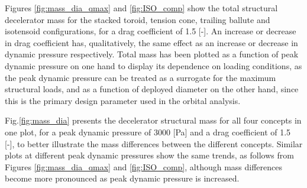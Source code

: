 
Figures \ref{fig:mass_dia_qmax} and \ref{fig:ISO_comp} show the total structural decelerator mass for the stacked toroid, tension cone, trailing ballute and isotensoid configurations, for a drag coefficient of 1.5 [-]. An increase or decrease in drag coefficient has, qualitatively, the same effect as an increase or decrease in dynamic pressure respectively. Total mass has been plotted as a function of peak dynamic pressure on one hand to display its dependence on loading conditions, as the peak dynamic pressure can be treated as a surrogate for the maximum structural loads, and as a function of deployed diameter on the other hand, since this is the primary design parameter used in the orbital analysis. 

Fig.\ref{fig:mass_dia} presents the decelerator structural mass for all four concepts in one plot, for a peak dynamic pressure of 3000 [Pa] and a drag coefficient of 1.5 [-], to better illustrate the mass differences between the different concepts. Similar plots at different peak dynamic pressures show the same trends, as follows from Figures \ref{fig:mass_dia_qmax} and \ref{fig:ISO_comp}, although mass differences become more pronounced as peak dynamic pressure is increased.

